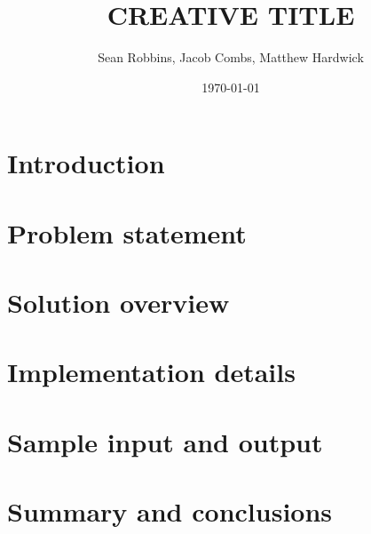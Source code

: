 \documentclass[11pt]{article} %
\title{CREATIVE TITLE}
\author{Sean Robbins, Jacob Combs, Matthew Hardwick}
\date{\today}
\begin{document}
\maketitle
\tableofcontents

\section{Introduction}


\section{Problem statement}


\section{Solution overview}


\section{Implementation details}


\section{Sample input and output}


\section{Summary and conclusions}




\end{document}
